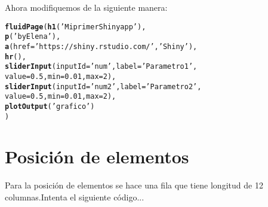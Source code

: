 \documentclass[11pt, oneside]{article}\usepackage[]{graphicx}\usepackage[]{color}
\makeatletter
\newcommand{\hlnum}[1]{\textcolor[rgb]{0.686,0.059,0.569}{#1}}%
\newcommand{\hlstr}[1]{\textcolor[rgb]{0.192,0.494,0.8}{#1}}%
\newcommand{\hlstd}[1]{\textcolor[rgb]{0.345,0.345,0.345}{#1}}%
\newcommand{\hlkwc}[1]{\textcolor[rgb]{0.333,0.667,0.333}{#1}}%
\newcommand{\hlkwd}[1]{\textcolor[rgb]{0.737,0.353,0.396}{\textbf{#1}}}%
\newenvironment{kframe}{%
 \def\at@end@of@kframe{}%
 \ifinner\ifhmode%
  \def\at@end@of@kframe{\end{minipage}}%
  \begin{minipage}{\columnwidth}%
 \fi\fi%
 \def\FrameCommand##1{\hskip\@totalleftmargin \hskip-\fboxsep
 \colorbox{shadecolor}{##1}\hskip-\fboxsep
     \hskip-\linewidth \hskip-\@totalleftmargin \hskip\columnwidth}%
 \MakeFramed {\advance\hsize-\width
   \@totalleftmargin\z@ \linewidth\hsize
   \@setminipage}}%
 {\par\unskip\endMakeFramed%
 \at@end@of@kframe}
\newenvironment{knitrout}{}{} %
\makeatother
\begin{document}
Ahora modifiquemos de la siguiente manera: 

\begin{knitrout}
\color{fgcolor}\begin{kframe}
\begin{alltt}
\hlkwd{fluidPage}\hlstd{(}\hlkwd{h1}\hlstd{(}\hlstr{'Mi primer Shiny app'}\hlstd{),}
          \hlkwd{p}\hlstd{(}\hlstr{'by Elena'}\hlstd{),}
          \hlkwd{a}\hlstd{(}\hlkwc{href}\hlstd{=}\hlstr{'https://shiny.rstudio.com/'}\hlstd{,}\hlstr{'Shiny'}\hlstd{),}
          \hlkwd{hr}\hlstd{(),}
          \hlkwd{sliderInput}\hlstd{(}\hlkwc{inputId}\hlstd{=} \hlstr{'num'}\hlstd{,} \hlkwc{label}\hlstd{=}\hlstr{'Parametro 1'}\hlstd{,}
                      \hlkwc{value}\hlstd{=}\hlnum{0.5}\hlstd{,} \hlkwc{min}\hlstd{=}\hlnum{0.01}\hlstd{,} \hlkwc{max}\hlstd{=}\hlnum{2}\hlstd{),}
          \hlkwd{sliderInput}\hlstd{(}\hlkwc{inputId}\hlstd{=} \hlstr{'num2'}\hlstd{,} \hlkwc{label}\hlstd{=}\hlstr{'Parametro 2'}\hlstd{,}
                      \hlkwc{value}\hlstd{=}\hlnum{0.5}\hlstd{,} \hlkwc{min}\hlstd{=}\hlnum{0.01}\hlstd{,}  \hlkwc{max}\hlstd{=}\hlnum{2}\hlstd{),}
          \hlkwd{plotOutput}\hlstd{(}\hlstr{'grafico'}\hlstd{)}
\hlstd{)}
\end{alltt}
\end{kframe}
\end{knitrout}





\section{Posición de elementos}

Para la posición de elementos se hace una fila que tiene longitud de 12 columnas.Intenta el siguiente código...
\end{document}
